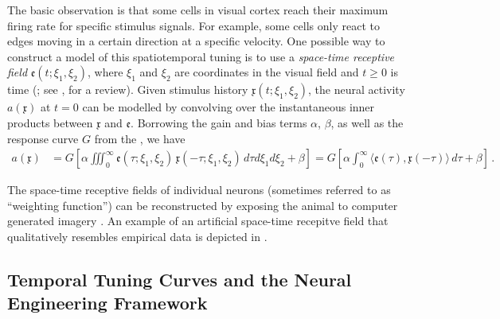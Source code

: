 The basic observation is that some cells in visual cortex reach their maximum firing rate for specific stimulus signals.
For example, some cells only react to edges moving in a certain direction at a specific velocity.
One possible way to construct a model of this spatiotemporal tuning is to use a \emph{space-time receptive field} $\mathfrak{e}(t; \xi_1, \xi_2)$, where $\xi_1$ and $\xi_2$ are coordinates in the visual field and $t \geq 0$ is time (\cite{watson1983look,adelson1985spatiotemporal}; see \cite{carandini1999linearity}, for a review).
Given stimulus history $\mathfrak{x}(t; \xi_1, \xi_2)$, the neural activity $a(\mathfrak{x})$ at $t = 0$ can be modelled by convolving over the instantaneous inner products between $\mathfrak{x}$ and $\mathfrak{e}$.
Borrowing the gain and bias terms $\alpha$, $\beta$, as well as the response curve $G$ from the \NEF, we have
\begin{align}
	a(\mathfrak{x})
		&= G\left[\alpha \! \iiint_0^\infty \!\!\! \mathfrak{e}(\tau; \xi_1, \xi_2) \, \mathfrak{x}(-\tau; \xi_1, \xi_2) \,
		\mathit{d \tau} \mathit{d \xi_1} \mathit{d \xi_2} + \beta \right]
		 = G\left[\alpha \! \int_0^\infty \!\!\! \big\langle \mathfrak{e}(\tau), \mathfrak{x}(-\tau) \big\rangle \,
		 \mathit{d \tau} + \beta \right] \, .
	\label{eqn:tuning_curve_from_temporal_receptive_field}
\end{align}

The space-time receptive fields of individual neurons (sometimes referred to as \enquote{weighting function}) can be reconstructed by exposing the animal to computer generated imagery \citep{mclean1989contribution}.
An example of an artificial space-time recepitve field that qualitatively resembles empirical data \citep[cf.][]{deangelis1993spatiotemporal} is depicted in .

\subsection{Temporal Tuning Curves and the Neural Engineering Framework}
\label{sec:temporal_tuning_nef}

